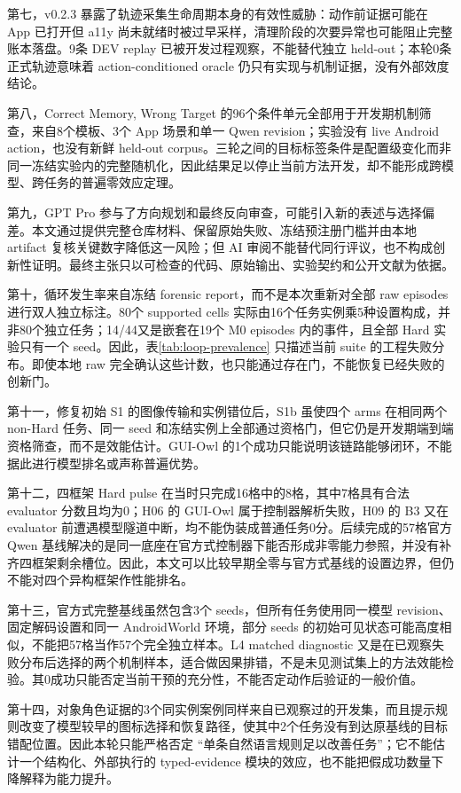 \documentclass[12pt,a4paper]{ctexart}
\begin{document}
第七，v0.2.3 暴露了轨迹采集生命周期本身的有效性威胁：动作前证据可能在 App 已打开但 a11y 尚未就绪时被过早采样，清理阶段的次要异常也可能阻止完整账本落盘。9条 DEV replay 已被开发过程观察，不能替代独立 held-out；本轮0条正式轨迹意味着 action-conditioned oracle 仍只有实现与机制证据，没有外部效度结论。

第八，Correct Memory, Wrong Target 的96个条件单元全部用于开发期机制筛查，来自8个模板、3个 App 场景和单一 Qwen revision；实验没有 live Android action，也没有新鲜 held-out corpus。三轮之间的目标标签条件是配置级变化而非同一冻结实验内的完整随机化，因此结果足以停止当前方法开发，却不能形成跨模型、跨任务的普遍零效应定理。

第九，GPT Pro 参与了方向规划和最终反向审查，可能引入新的表述与选择偏差。本文通过提供完整仓库材料、保留原始失败、冻结预注册门槛并由本地 artifact 复核关键数字降低这一风险；但 AI 审阅不能替代同行评议，也不构成创新性证明。最终主张只以可检查的代码、原始输出、实验契约和公开文献为依据。

第十，循环发生率来自冻结 forensic report，而不是本次重新对全部 raw episodes 进行双人独立标注。80个 supported cells 实际由16个任务实例乘5种设置构成，并非80个独立任务；14/44又是嵌套在19个 M0 episodes 内的事件，且全部 Hard 实验只有一个 seed。因此，表\ref{tab:loop-prevalence} 只描述当前 suite 的工程失败分布。即使本地 raw 完全确认这些计数，也只能通过存在门，不能恢复已经失败的创新门。

第十一，修复初始 S1 的图像传输和实例错位后，S1b 虽使四个 arms 在相同两个 non-Hard 任务、同一 seed 和冻结实例上全部通过资格门，但它仍是开发期端到端资格筛查，而不是效能估计。GUI-Owl 的1个成功只能说明该链路能够闭环，不能据此进行模型排名或声称普遍优势。

第十二，四框架 Hard pulse 在当时只完成16格中的8格，其中7格具有合法 evaluator 分数且均为0；H06 的 GUI-Owl 属于控制器解析失败，H09 的 B3 又在 evaluator 前遭遇模型隧道中断，均不能伪装成普通任务0分。后续完成的57格官方 Qwen 基线解决的是同一底座在官方式控制器下能否形成非零能力参照，并没有补齐四框架剩余槽位。因此，本文可以比较早期全零与官方式基线的设置边界，但仍不能对四个异构框架作性能排名。

第十三，官方式完整基线虽然包含3个 seeds，但所有任务使用同一模型 revision、固定解码设置和同一 AndroidWorld 环境，部分 seeds 的初始可见状态可能高度相似，不能把57格当作57个完全独立样本。L4 matched diagnostic 又是在已观察失败分布后选择的两个机制样本，适合做因果排错，不是未见测试集上的方法效能检验。其0成功只能否定当前干预的充分性，不能否定动作后验证的一般价值。

第十四，对象角色证据的3个同实例案例同样来自已观察过的开发集，而且提示规则改变了模型较早的图标选择和恢复路径，使其中2个任务没有到达原基线的目标错配位置。因此本轮只能严格否定 ``单条自然语言规则足以改善任务''；它不能估计一个结构化、外部执行的 typed-evidence 模块的效应，也不能把假成功数量下降解释为能力提升。
\end{document}
